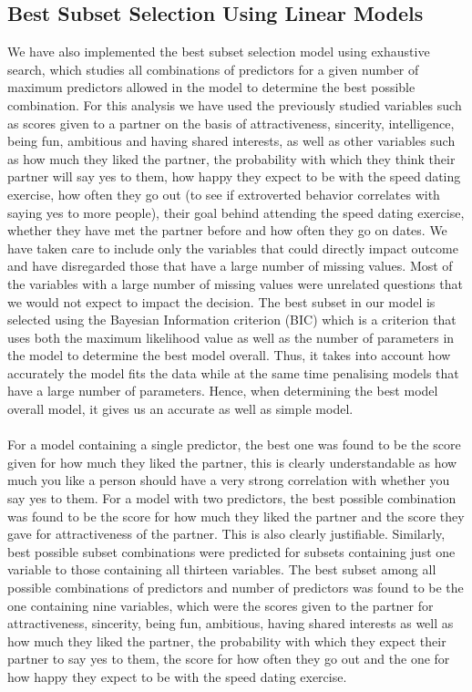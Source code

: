 \documentclass{article}
\begin{document}
\subsection{Best Subset Selection Using Linear Models}
We have also implemented the best subset selection model using exhaustive search, which studies all combinations of predictors for a given number of maximum predictors allowed in the model to determine the best possible combination. For this analysis we have used the previously studied variables such as scores given to a partner on the basis of attractiveness, sincerity, intelligence, being fun, ambitious and having shared interests, as well as other variables such as how much they liked the partner, the probability with which they think their partner will say yes to them, how happy they expect to be with the speed dating exercise, how often they go out (to see if extroverted behavior correlates with saying yes to more people), their goal behind attending the speed dating exercise, whether they have met the partner before and how often they go on dates. We have taken care to include only the variables that could directly impact outcome and have disregarded those that have a large number of missing values. Most of the variables with a large number of missing values were unrelated questions that we would not expect to impact the decision. The best subset in our model is selected using the Bayesian Information criterion (BIC) which is a criterion that uses both the maximum likelihood value as well as the number of parameters in the model to determine the best model overall. Thus, it takes into account how accurately the model fits the data while at the same time penalising models that have a large number of parameters. Hence, when determining the best model overall model, it gives us an accurate as well as simple model.\\
\null\\
For a model containing a single predictor, the best one was found to be the score given for how much they liked the partner, this is clearly understandable as how much you like a person should have a very strong correlation with whether you say yes to them. For a model with two predictors, the best possible combination was found to be the score for how much they liked the partner and the score they gave for attractiveness of the partner. This is also clearly justifiable. Similarly, best possible subset combinations were predicted for subsets containing just one variable to those containing all thirteen variables. The best subset among all possible combinations of predictors and number of predictors was found to be the one containing nine variables, which were the scores given to the partner for attractiveness, sincerity, being fun, ambitious, having shared interests as well as how much they liked the partner, the probability with which they expect their partner to say yes to them, the score for how often they go out and the one for how happy they expect to be with the speed dating exercise. 
\end{document}
